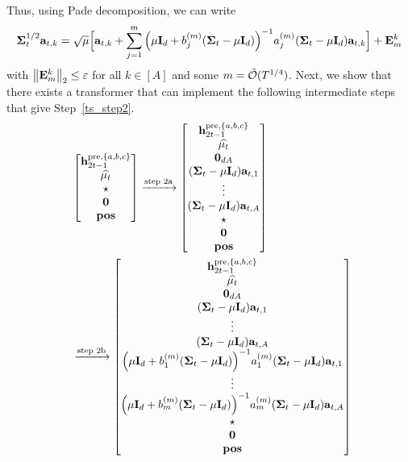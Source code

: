 Thus, using Pade decomposition, we can write $$
{{\mathbf\Sigma}}_t^{1/2}{\mathbf a}_{t,k}=\sqrt{{\mu}}\Big[{\mathbf a}_{t,k}+\sum_{j=1}^m \Big({{\mu}}{\mathbf I}_d+{b_j^{(m)}({{\mathbf\Sigma}}_t-{\mu} {\mathbf I}_d)}\Big)^{-1}{a_j^{(m)}({{\mathbf\Sigma}}_t-{\mu} {\mathbf I}_d){\mathbf a}_{t,k}}\Big]+{\mathbf {E}}_m^k$$ with $\left\|{{\mathbf {E}}_m^k}\right\|_2\leq\varepsilon$ for all $k\in[A]$ and some $m={\tilde{\mathcal O}}(T^{1/4})$. Next, we show that there exists a transformer that can implement the following intermediate steps that give Step~\ref{ts_step2}.
\begin{align}
   &~\begin{bmatrix}
    {\mathbf h}_{2t-1}^{{\mathrm{pre}},\{{a},{b},{c}\}} \\
        \widehat{{{\mathbf\mu}}_t}\\ \star\\ {\mathbf 0} \\{\mathbf{pos}}
\end{bmatrix}
\xrightarrow{\text{step 2a}}
   \begin{bmatrix}
    {\mathbf h}_{2t-1}^{{\mathrm{pre}},\{{a},{b},{c}\}}\\\widehat{{{\mathbf\mu}}_t} 
        \\{\mathbf 0}_{dA}\\
{({{\mathbf\Sigma}}_t-{\mu}{\mathbf I}_d){\mathbf a}_{t,1}}
\\\vdots\\
        {({{\mathbf\Sigma}}_t-{\mu}{\mathbf I}_d){\mathbf a}_{t,A}}\\
        \star\\ {\mathbf 0} \\{\mathbf{pos}}
\end{bmatrix}\nonumber
\\ &~\xrightarrow{\text{step 2b}}
     \begin{bmatrix}
    {\mathbf h}_{2t-1}^{{\mathrm{pre}},\{{a},{b},{c}\}}\\\widehat{{{\mathbf\mu}}_t} 
        \\{\mathbf 0}_{dA}\\
{({{\mathbf\Sigma}}_t-{\mu}{\mathbf I}_d){\mathbf a}_{t,1}}
\\\vdots\\
       {({{\mathbf\Sigma}}_t-{\mu}{\mathbf I}_d){\mathbf a}_{t,A}}
        \\ 
        \Big({{\mu}}{\mathbf I}_d+{b_1^{(m)}({{\mathbf\Sigma}}_t-{\mu} {\mathbf I}_d)}\Big)^{-1}{a_1^{(m)}({{\mathbf\Sigma}}_t-{\mu} {\mathbf I}_d){\mathbf a}_{t,1}}\\
        \vdots
        \\ 
          \Big({{\mu}}{\mathbf I}_d+{b_m^{(m)}({{\mathbf\Sigma}}_t-{\mu} {\mathbf I}_d)}\Big)^{-1}{a_m^{(m)}({{\mathbf\Sigma}}_t-{\mu} {\mathbf I}_d){\mathbf a}_{t,A}}
          \\\star\\ {\mathbf 0} \\{\mathbf{pos}}

\end{bmatrix}
\end{align}
